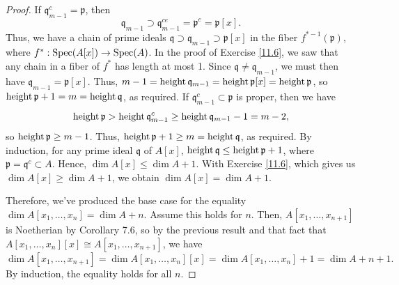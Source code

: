 \begin{proof}
If $\mathfrak{q}_{m-1}^c = \mathfrak{p}$, then
$$\mathfrak{q}_{m-1} \supset \mathfrak{q}_{m-1}^{ce} = \mathfrak{p}^e = \mathfrak{p}[x].$$
Thus, we have a chain of prime ideals $\mathfrak{q} \supset \mathfrak{q}_{m-1} \supset \mathfrak{p}[x]$ in the fiber $f^{*-1}(\mathfrak{p})$, where $f^* : \operatorname{Spec}(A[x]) \to \operatorname{Spec}(A)$.
In the proof of Exercise \ref{11.6}, we saw that any chain in a fiber of $f^*$ has length at most 1. Since $\mathfrak{q} \neq \mathfrak{q}_{m-1}$, we must then have
$\mathfrak{q}_{m-1} = \mathfrak{p}[x]$. Thus, $m-1 = \operatorname{height} \mathfrak{q}_{m-1} = \operatorname{height} \mathfrak{p}[x] = \operatorname{height} \mathfrak{p}$, so 
$\operatorname{height} \mathfrak{p} + 1 = m = \operatorname{height} \mathfrak{q}$, as required. If $\mathfrak{q}_{m-1}^c \subset \mathfrak{p}$ is proper, then we have
$$\operatorname{height} \mathfrak{p} > \operatorname{height} \mathfrak{q}_{m-1}^c \ge \operatorname{height} \mathfrak{q}_{m-1} - 1 = m - 2,$$
so $\operatorname{height} \mathfrak{p} \ge m - 1$. Thus, $\operatorname{height} \mathfrak{p} + 1 \ge m = \operatorname{height} \mathfrak{q}$, as required. By induction, for any prime ideal $\mathfrak{q}$ of $A[x]$, 
$\operatorname{height}\mathfrak{q} \le \operatorname{height}\mathfrak{p} + 1$, where $\mathfrak{p} = \mathfrak{q}^c \subset A$. Hence, $\dim A[x] \le \dim A + 1$. With Exercise \ref{11.6},
which gives us $\dim A[x] \ge \dim A + 1$, we obtain $\dim A[x] = \dim A + 1$.

Therefore, we've produced the base case for the equality $\dim A[x_1,\ldots,x_n] = \dim A + n$. Assume this holds for $n$. Then, $A[x_1,\ldots,x_{n+1}]$ is Noetherian
by Corollary 7.6, so by the previous result and that fact that $A[x_1,\ldots,x_n][x] \cong A[x_1,\ldots,x_{n+1}]$, we have
$$\dim A[x_1,\ldots,x_{n+1}] = \dim A[x_1,\ldots,x_n][x] =  \dim A[x_1,\ldots,x_n] + 1 = \dim A + n + 1.$$
By induction, the equality holds for all $n$.
\end{proof}
